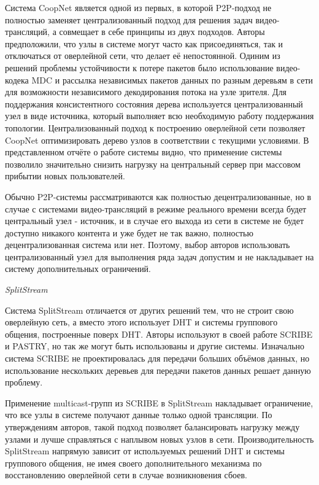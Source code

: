 		Система CoopNet является одной из первых, в которой P2P-подход не полностью заменяет централизованный подход
		для решения задач видео-трансляций, а совмещает в себе принципы из двух подходов. Авторы предположили, что
		узлы в системе могут часто как присоединяться, так и отключаться от оверлейной сети, что делает её непостоянной.
		Одиним из решений проблемы устойчивости к потере пакетов было использование видео-кодека MDC и рассылка
		независимых пакетов данных по разным деревьям в сети для возможности независимого декодирования потока на
		узле зрителя. Для поддержания консистентного состояния дерева используется централизованный узел в виде
		источника, который выполняет всю необходимую работу поддержания топологии. Централизованный подход к построению
		оверлейной сети позволяет CoopNet оптимизировать дерево узлов в соответствии с текущими условиями.
		В представленном отчёте о работе системы видно, что применение системы позволило значительно снизить нагрузку
		на центральный сервер при массовом прибытии новых пользователей.

		Обычно P2P-системы рассматриваются как полностью децентрализованные, но в случае с системами видео-трансляций в
		режиме реального времени всегда будет центральный узел - источник, и в случае его выхода из сети в системе не
		будет доступно никакого контента и уже будет не так важно, полностью децентрализованная система или нет.
		Поэтому, выбор авторов использовать централизованный узел для выполнения ряда задач допустим и не накладывает на
		систему дополнительных ограничений.

		\textit{SplitStream}

		Система SplitStream отличается от других решений тем, что не строит свою оверлейную сеть, а вместо этого
		использует DHT и системы группового общения, построенные поверх DHT. Авторы используют в своей работе SCRIBE и
		PASTRY, но так же могут быть использованы и другие системы. Изначально система SCRIBE не проектировалась для
		передачи больших объёмов данных, но использование нескольких деревьев для передачи пакетов данных решает данную
		проблему.

		Применение multicast-групп из SCRIBE в SplitStream накладывает ограничение, что все узлы в системе получают
		данные только одной трансляции. По утверждениям авторов, такой подход позволяет балансировать нагрузку между
		узлами и лучше справляться с наплывом новых узлов в сети. Производительность SplitStream напрямую зависит от
		используемых решений DHT и системы группового общения, не имея своего дополнительного механизма по
		восстановлению оверлейной сети в случае возникновения сбоев.

